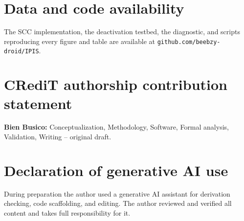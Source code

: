 \documentclass[review,times]{elsarticle}
\theoremstyle{definition}
\theoremstyle{remark}
\begin{document}








\section*{Data and code availability}
The SCC implementation, the deactivation testbed, the diagnostic, and scripts reproducing every
figure and table are available at \texttt{github.com/beebzy-droid/IPIS}.

\section*{CRediT authorship contribution statement}
\textbf{Bien Busico:} Conceptualization, Methodology, Software, Formal analysis, Validation,
Writing -- original draft.

\section*{Declaration of generative AI use}
During preparation the author used a generative AI assistant for derivation checking, code
scaffolding, and editing. The author reviewed and verified all content and takes full
responsibility for it.


\appendix
\setcounter{table}{0}\setcounter{figure}{0}
\renewcommand{\thetable}{\Alph{section}.\arabic{table}}
\renewcommand{\thefigure}{\Alph{section}.\arabic{figure}}




\end{document}
